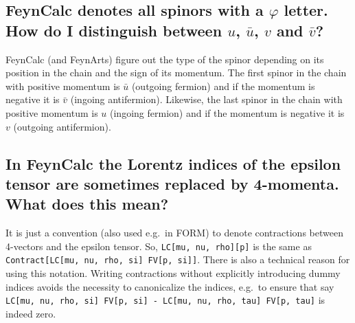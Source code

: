 \documentclass[../FeynCalcManual.tex]{subfiles}
\begin{document}
\hypertarget{feyncalc-denotes-all-spinors-with-a-varphi-letter.-how-do-i-distinguish-between-u-baru-v-and-barv}{%
\subsection{\texorpdfstring{FeynCalc denotes all spinors with a
\(\varphi\) letter. How do I distinguish between \(u\), \(\bar{u}\),
\(v\) and
\(\bar{v}\)?}{FeynCalc denotes all spinors with a \textbackslash varphi letter. How do I distinguish between u, \textbackslash bar\{u\}, v and \textbackslash bar\{v\}?}}\label{feyncalc-denotes-all-spinors-with-a-varphi-letter.-how-do-i-distinguish-between-u-baru-v-and-barv}}

FeynCalc (and FeynArts) figure out the type of the spinor depending on
its position in the chain and the sign of its momentum. The first spinor
in the chain with positive momentum is \(\bar{u}\) (outgoing fermion)
and if the momentum is negative it is \(\bar{v}\) (ingoing antifermion).
Likewise, the last spinor in the chain with positive momentum is \(u\)
(ingoing fermion) and if the momentum is negative it is \(v\) (outgoing
antifermion).

\hypertarget{in-feyncalc-the-lorentz-indices-of-the-epsilon-tensor-are-sometimes-replaced-by-4-momenta.-what-does-this-mean}{%
\subsection{In FeynCalc the Lorentz indices of the epsilon tensor are
sometimes replaced by 4-momenta. What does this
mean?}\label{in-feyncalc-the-lorentz-indices-of-the-epsilon-tensor-are-sometimes-replaced-by-4-momenta.-what-does-this-mean}}

It is just a convention (also used e.g.~in FORM) to denote contractions
between 4-vectors and the epsilon tensor. So,
\texttt{LC[\allowbreak{}mu,\ \allowbreak{}nu,\ \allowbreak{}rho][\allowbreak{}p]}
is the same as
\texttt{Contract[\allowbreak{}LC[\allowbreak{}mu,\ \allowbreak{}nu,\ \allowbreak{}rho,\ \allowbreak{}si] FV[\allowbreak{}p,\ \allowbreak{}si]]}.
There is also a technical reason for using this notation. Writing
contractions without explicitly introducing dummy indices avoids the
necessity to canonicalize the indices, e.g.~to ensure that say
\texttt{LC[\allowbreak{}mu,\ \allowbreak{}nu,\ \allowbreak{}rho,\ \allowbreak{}si] FV[\allowbreak{}p,\ \allowbreak{}si] - LC[\allowbreak{}mu,\ \allowbreak{}nu,\ \allowbreak{}rho,\ \allowbreak{}tau] FV[\allowbreak{}p,\ \allowbreak{}tau]}
is indeed zero.
\end{document}
